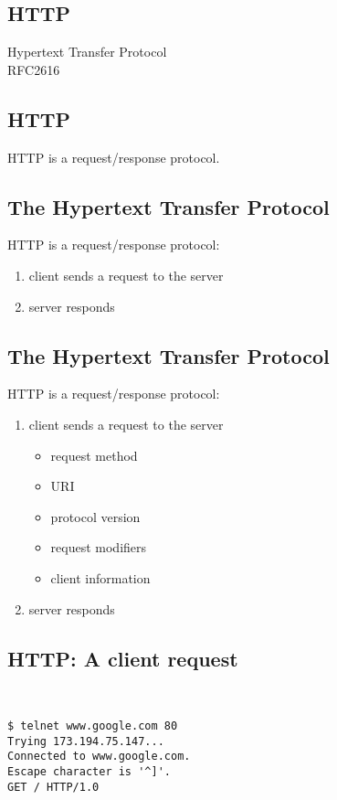 \documentclass[xga]{xdvislides}
\begin{document}
\subsection{HTTP}
\vspace{.5in}
\begin{center}
	\Huge
	Hypertext Transfer Protocol
	\\
	\vspace{.5in}
	RFC2616
\end{center}
\Normalsize

\subsection{HTTP}
\vspace{.5in}
\begin{center}
	\Huge
	HTTP is a request/response protocol.
\end{center}
\Normalsize

\subsection{The Hypertext Transfer Protocol}
HTTP is a request/response protocol:
\begin{enumerate}
	\item client sends a request to the server
	\item server responds
\end{enumerate}

\subsection{The Hypertext Transfer Protocol}
HTTP is a request/response protocol:
\begin{enumerate}
	\item client sends a request to the server
		\begin{itemize}
			\item request method
			\item URI
			\item protocol version
			\item request modifiers
			\item client information
		\end{itemize}
	\item server responds
\end{enumerate}

\subsection{HTTP: A client request}
\vspace*{.5in}
\\
\Hugesize
\begin{center}
\begin{verbatim}
$ telnet www.google.com 80
Trying 173.194.75.147...
Connected to www.google.com.
Escape character is '^]'.
GET / HTTP/1.0
\end{verbatim}
\end{center}
\Normalsize
\vspace*{\fill}
\end{document}
